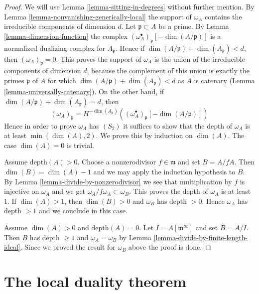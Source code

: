 \begin{proof}
We will use Lemma \ref{lemma-sitting-in-degrees} without further mention.
By Lemma \ref{lemma-nonvanishing-generically-local} the support
of $\omega_A$ contains the irreducible components of dimension $d$.
Let $\mathfrak p \subset A$ be a prime. By Lemma \ref{lemma-dimension-function}
the complex $(\omega_A^\bullet)_{\mathfrak p}[-\dim(A/\mathfrak p)]$
is a normalized dualizing complex for $A_\mathfrak p$. Hence if
$\dim(A/\mathfrak p) + \dim(A_\mathfrak p) < d$, then
$(\omega_A)_\mathfrak p = 0$.
This proves the support of $\omega_A$ is the union of the irreducible
components of dimension $d$, because the complement of this union
is exactly the primes $\mathfrak p$ of $A$ for which
$\dim(A/\mathfrak p) + \dim(A_\mathfrak p) < d$ as $A$ is catenary
(Lemma \ref{lemma-universally-catenary}).
On the other hand, if $\dim(A/\mathfrak p) + \dim(A_\mathfrak p) = d$, then
$$
(\omega_A)_\mathfrak p =
H^{-\dim(A_\mathfrak p)}\left(
(\omega_A^\bullet)_{\mathfrak p}[-\dim(A/\mathfrak p)] \right)
$$
Hence in order to prove $\omega_A$ has $(S_2)$ it suffices to show that
the depth of $\omega_A$ is at least $\min(\dim(A), 2)$.
We prove this by induction on $\dim(A)$. The case $\dim(A) = 0$ is
trivial.

\medskip\noindent
Assume $\text{depth}(A) > 0$. Choose a nonzerodivisor $f \in \mathfrak m$
and set $B = A/fA$. Then $\dim(B) = \dim(A) - 1$ and we may apply the
induction hypothesis to $B$. By Lemma \ref{lemma-divide-by-nonzerodivisor}
we see that multiplication by $f$ is injective on $\omega_A$ and we get
$\omega_A/f\omega_A \subset \omega_B$. This proves the depth of $\omega_A$
is at least $1$. If $\dim(A) > 1$, then $\dim(B) > 0$ and $\omega_B$
has depth $ > 0$. Hence $\omega_A$ has depth $> 1$ and we conclude in
this case.

\medskip\noindent
Assume $\dim(A) > 0$ and $\text{depth}(A) = 0$. Let
$I = A[\mathfrak m^\infty]$ and set $B = A/I$. Then $B$ has
depth $\geq 1$ and $\omega_A = \omega_B$ by
Lemma \ref{lemma-divide-by-finite-length-ideal}.
Since we proved the result for $\omega_B$ above the proof is done.
\end{proof}





\section{The local duality theorem}
\label{section-local-duality}

